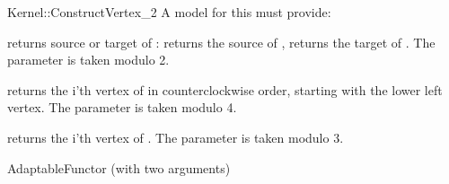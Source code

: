 \begin{ccRefFunctionObjectConcept}{Kernel::ConstructVertex_2}
A model for this must provide:



 {returns source or target of : \ccVar{}
  returns the source of , \ccVar{} returns the target
  of . The parameter  is taken modulo 2. }

 {returns the i'th vertex of
   in counterclockwise order, starting with the lower left
  vertex. The parameter  is taken modulo 4.}

 {returns the i'th vertex of . The parameter
   is taken modulo 3.}


\ccRefines
AdaptableFunctor (with two arguments)

\ccSeeAlso
{} \\
 \\
 \\

\end{ccRefFunctionObjectConcept}
